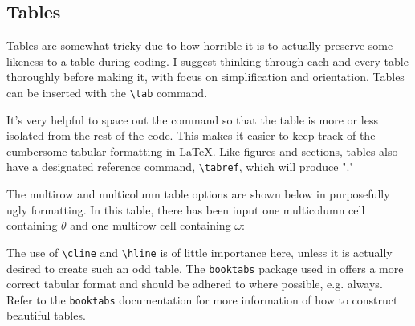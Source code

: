 \subsection{Tables}\label{sec.tables}

Tables are somewhat tricky due to how horrible it is to actually preserve some likeness to a table during coding. I suggest thinking through each and every table thoroughly before making it, with focus on simplification and orientation. Tables can be inserted with the \verb|\tab| command.

	
It's very helpful to space out the command so that the table is more or less isolated from the rest of the code. This makes it easier to keep track of the cumbersome tabular formatting in \LaTeX{}. Like figures and sections, tables also have a designated reference command, \verb|\tabref|, which will produce "."
	
The multirow and multicolumn table options are shown below in purposefully ugly formatting. In this table, there has been input one multicolumn cell containing $\theta$ and one multirow cell containing $\omega$:

	
The use of \verb|\cline| and \verb|\hline| is of little importance here, unless it is actually desired to create such an odd table. The \verb|booktabs| package used in  offers a more correct tabular format and should be adhered to where possible, e.g. always. Refer to the \verb|booktabs| documentation for more information of how to construct beautiful tables.~\cite{package.booktabs}

